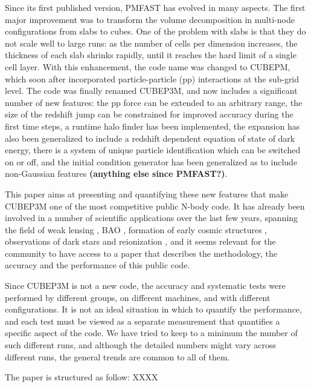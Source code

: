Since its first published version, {\small PMFAST} has evolved in many aspects. 
The first major improvement was to transform the volume decomposition in multi-node configurations 
from slabs to cubes. One of the problem with slabs is that they do not scale well to large runs: 
as the number of cells per dimension increases, the thickness of each slab shrinks rapidly,
until it reaches the hard limit of a single cell layer.  With this enhancement, the code name was changed to {\small CUBEPM},
which soon after incorporated particle-particle (pp) interactions at the sub-grid level. 
The code was finally renamed {\small CUBEP3M}, and now includes a significant number of new features: the pp force
can be extended to an arbitrary range, the size of the redshift jump can be constrained for improved accuracy during the first time steps,
a runtime halo finder has been implemented, the expansion has also been generalized to include a redshift dependent equation of state of dark energy, there is a system of unique particle identification which can be switched on or off, and the initial condition generator has been generalized as to include non-Gaussian features {\bf (anything else since PMFAST?)}.

This paper aims at presenting and quantifying these new features that make {\small CUBEP3M} one of the most competitive public N-body code.
It has already been involved in a number of scientific applications over the last few years,
spanning the field of weak lensing \citep{Vafaei10, 2008MNRAS.388.1819L,  2009arXiv0905.0501D, 2010PhRvD..81l3015L, 2010arXiv1012.0444Y, Harnois_Vafaei},  BAO
 \citep{2010arXiv1008.3506Z,  2011arXiv1106.5548N, 2011arXiv1109.5746H, HarnoisYuReco}, 
formation of early cosmic structures \citep{2008arXiv0806.2887I,2010arXiv1005.2502I},
observations of dark stars \citep{2010MNRAS.407L..74Z,2012MNRAS.tmp.2794I} and
reionization \citep{2011arXiv1107.4772I,Fernandez:2011ab,2011MNRAS.413.1353F,2012MNRAS.422..926M,Datta:2011hv,2012arXiv1203.0517F},  
and it seems relevant for the community to have access to a paper that describes the methodology, the accuracy and the performance of this public code. 

Since {\small CUBEP3M} is not a new code, the accuracy and systematic tests were performed by different groups, on different machines,
and with different configurations. It is not an ideal situation in which to quantify the performance, and each test must be viewed as a
separate measurement that quantifies a specific aspect of the code. 
We have tried to keep to a minimum the number of such different runs, and although the detailed numbers might vary across different runs, 
the general trends are common to all of them.


The paper is structured as follow: XXXX 



